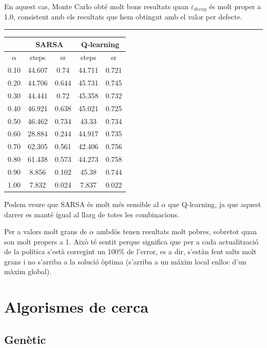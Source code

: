 \documentclass[12pt,a4paper]{report}
\begin{document}
En aquest cas, Monte Carlo obté molt bons resultats quan $\varepsilon_{decay}$ és molt proper a 1.0,
consistent amb els resultats que hem obtingut amb el valor per defecte.

\vspace*{10pt}\hrule

\begin{table}[H]
  \centering
  \begin{tabular}{| c | c c | c c |}
    \hline
      & \multicolumn{2}{|c|}{SARSA} & \multicolumn{2}{|c|}{Q-learning} \\
    \hline
    $\alpha$ & steps & sr & steps & sr \\
    \hline
    0.10 & 44.607 & 0.74  & 44.711 & 0.721 \\
    0.20 & 44.706 & 0.644 & 45.731 & 0.745 \\
    0.30 & 44.441 & 0.72  & 45.358 & 0.732 \\
    0.40 & 46.921 & 0.638 & 45.021 & 0.725 \\
    0.50 & 46.462 & 0.734 & 43.33  & 0.734 \\
    0.60 & 28.884 & 0.244 & 44.917 & 0.735 \\
    0.70 & 62.305 & 0.561 & 42.406 & 0.756 \\
    0.80 & 61.438 & 0.573 & 44.273 & 0.758 \\
    0.90 & 8.856  & 0.102 & 45.38  & 0.744 \\
    1.00 & 7.832  & 0.024 & 7.837  & 0.022 \\
    \hline
  \end{tabular}
\end{table}
Podem veure que SARSA és molt més sensible al $\alpha$ que Q-learning,
ja que aquest darrer es manté igual al llarg de totes les combinacions.

Per a valors molt grans de $\alpha$ ambdós tenen resultats molt pobres, sobretot quan
son molt propers a 1. Això té sentit perque significa que per a cada actualització de la política s'està
corregint un 100\% de l'error, es a dir, s'estàn fent salts molt grans i no s'arriba a la solució òptima
(s'arriba a un máxim local enlloc d'un màxim global).

\section{Algorismes de cerca}

\subsection{Genètic}
\end{document}
